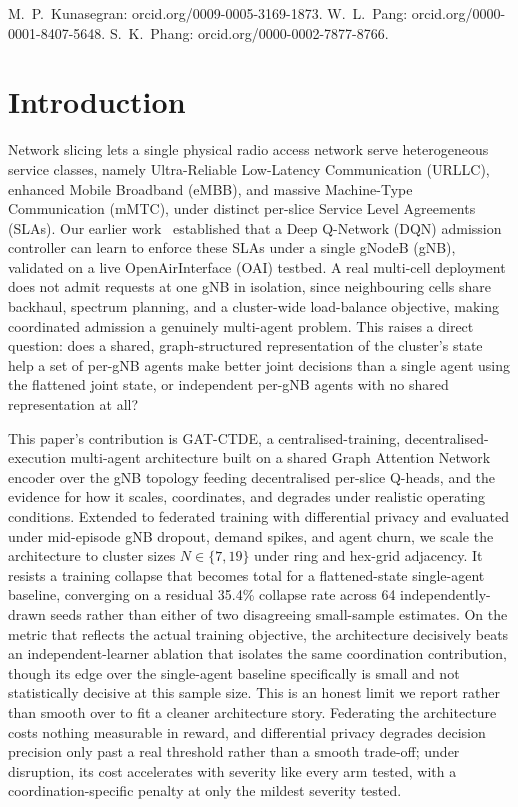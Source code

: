 \documentclass[pdflatex,sn-basic,Numbered]{sn-jnl}%
\begin{document}
\maketitle

\noindent\footnotesize
M.~P.~Kunasegran: orcid.org/0009-0005-3169-1873.
W.~L.~Pang: orcid.org/0000-0001-8407-5648.
S.~K.~Phang: orcid.org/0000-0002-7877-8766.
\normalsize
\vspace{6pt}

\section{Introduction}
Network slicing lets a single physical radio access network serve heterogeneous service classes, namely Ultra-Reliable Low-Latency Communication (URLLC), enhanced Mobile Broadband (eMBB), and massive Machine-Type Communication (mMTC), under distinct per-slice Service Level Agreements (SLAs). Our earlier work~\cite{mecon-paper1,icraie-paper2}
established that a Deep Q-Network (DQN) admission controller can learn
to enforce these SLAs under a single gNodeB (gNB), validated on a live
OpenAirInterface (OAI) testbed. A real multi-cell deployment does not admit requests at one gNB in isolation, since neighbouring cells share backhaul, spectrum planning, and a cluster-wide load-balance objective, making coordinated admission a genuinely multi-agent problem. This raises a direct question: does a shared, graph-structured representation of the cluster's state help a set of per-gNB agents make better joint decisions than a single agent using the flattened joint state, or independent per-gNB agents with no shared representation at all?

This paper's contribution is GAT-CTDE, a centralised-training,
decentralised-execution multi-agent architecture built on a shared
Graph Attention Network~\cite{gat} encoder over the gNB topology
feeding decentralised per-slice Q-heads, and the evidence for how it
scales, coordinates, and degrades under realistic operating
conditions. Extended to federated training with differential privacy and evaluated under mid-episode gNB dropout, demand spikes, and agent churn, we scale the architecture to cluster sizes $N \in \{7, 19\}$ under ring and hex-grid adjacency. It resists a training collapse that becomes total for a flattened-state single-agent baseline, converging on a residual 35.4\% collapse rate across 64 independently-drawn seeds rather than either of two disagreeing small-sample estimates. On the metric that reflects the actual training objective, the architecture decisively beats an independent-learner ablation that isolates the same coordination contribution, though its edge over the single-agent baseline specifically is small and not statistically decisive at this sample size. This is an honest limit we report rather than smooth over to fit a cleaner architecture story. Federating the architecture costs nothing
measurable in reward, and differential privacy degrades decision
precision only past a real threshold rather than a smooth trade-off;
under disruption, its cost accelerates with severity like every arm
tested, with a coordination-specific penalty at only the mildest
severity tested.
\end{document}

